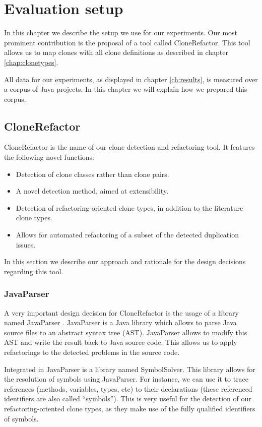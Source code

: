 \chapter{Evaluation setup}
In this chapter we describe the setup we use for our experiments. Our most prominent contribution is the proposal of a tool called CloneRefactor. This tool allows us to map clones with all clone definitions as described in chapter \ref{chap:clonetypes}.

All data for our experiments, as displayed in chapter \ref{ch:results}, is measured over a corpus of Java projects. In this chapter we will explain how we prepared this corpus.

\section{CloneRefactor}
CloneRefactor is the name of our clone detection and refactoring tool. It features the following novel functions:
\begin{itemize}
  \item Detection of clone classes rather than clone pairs.
  \item A novel detection method, aimed at extensibility.
  \item Detection of refactoring-oriented clone types, in addition to the literature clone types.
  \item Allows for automated refactoring of a subset of the detected duplication issues.
\end{itemize}
In this section we describe our approach and rationale for the design decisions regarding this tool.

\subsection{JavaParser}
A very important design decision for CloneRefactor is the usage of a library named JavaParser \cite{tomassetti2017javaparser}. JavaParser is a Java library which allows to parse Java source files to an abstract syntax tree (AST). JavaParser allows to modify this AST and write the result back to Java source code. This allows us to apply refactorings to the detected problems in the source code.

Integrated in JavaParser is a library named SymbolSolver. This library allows for the resolution of symbols using JavaParser. For instance, we can use it to trace references (methods, variables, types, etc) to their declarations (these referenced identifiers are also called ``symbols''). This is very useful for the detection of our refactoring-oriented clone types, as they make use of the fully qualified identifiers of symbols.

